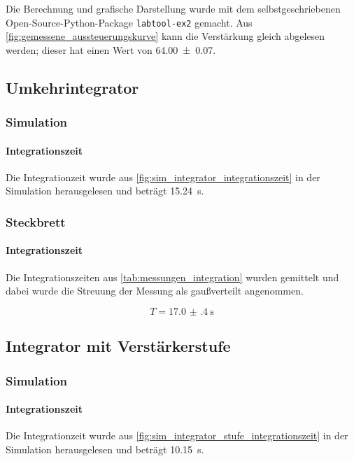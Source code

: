 \documentclass[12pt,english,ngerman]{scrartcl}
\begin{document}
Die Berechnung und grafische Darstellung wurde mit dem selbstgeschriebenen
Open-Source-Python-Package \texttt{labtool-ex2}\cite{labtool} gemacht. Aus
\autoref{fig:gemessene_aussteuerungskurve} kann die Verstärkung gleich
abgelesen werden; dieser hat einen Wert von \num{64.00(7)}.


\subsection{Umkehrintegrator}

\subsubsection{Simulation}

\paragraph{Integrationszeit}
Die Integrationzeit wurde aus \autoref{fig:sim_integrator_integrationszeit} in der Simulation herausgelesen und beträgt \SI{15.24}{\second}.

\subsubsection{Steckbrett}
\paragraph{Integrationszeit}
Die Integrationszeiten aus \autoref{tab:messungen_integration} wurden gemittelt
und dabei wurde die Streuung der Messung als gaußverteilt angenommen.

\begin{equation}
  T = \SI{17.0(4)}{\second}
  \label{eq:wert_integrationszeit}
\end{equation}

\subsection{Integrator mit Verstärkerstufe}
\subsubsection{Simulation}

\paragraph{Integrationszeit}
Die Integrationzeit wurde aus \autoref{fig:sim_integrator_stufe_integrationszeit} in der Simulation herausgelesen und beträgt \SI{10.15}{\second}.
\end{document}
